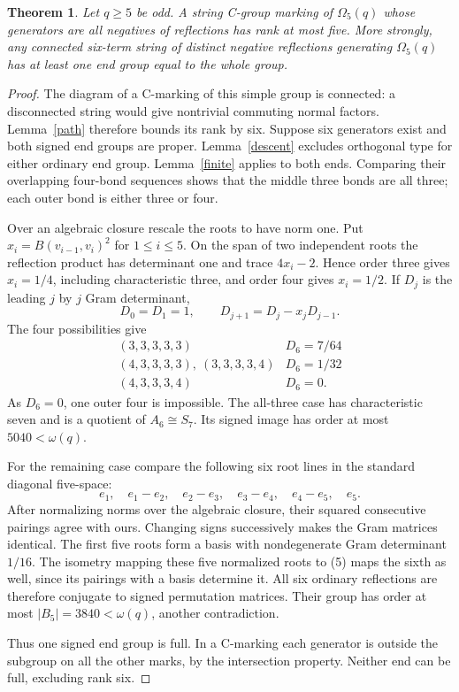 \documentclass[11pt,a4paper]{article}
\newtheorem{theorem}{Theorem}
\newcommand{\Om}{\Omega}
\begin{document}
\begin{theorem}\label{bound}
Let $q\ge5$ be odd. A string C-group marking of $\Om_5(q)$
whose generators are all negatives of reflections has rank at most
five. More strongly, any connected six-term string of distinct negative
reflections generating $\Om_5(q)$ has at least one end group equal
to the whole group.
\end{theorem}
\begin{proof}
The diagram of a C-marking of this simple group is connected:
a disconnected string would give nontrivial commuting normal factors.
Lemma~\ref{path} therefore bounds its rank by six. Suppose six generators
exist and both signed end groups are proper. Lemma~\ref{descent}
excludes orthogonal type for either ordinary end group.
Lemma~\ref{finite} applies to both ends. Comparing their overlapping
four-bond sequences shows that the middle three bonds are all three;
each outer bond is either three or four.

Over an algebraic closure rescale the roots to have norm one.
Put $x_i=B(v_{i-1},v_i)^2$ for $1\le i\le5$.
On the span of two independent roots the reflection product has
determinant one and trace $4x_i-2$. Hence order three gives
$x_i=1/4$, including characteristic three, and order four gives
$x_i=1/2$. If $D_j$ is the leading $j$ by $j$ Gram determinant,
\[
 D_0=D_1=1,\qquad D_{j+1}=D_j-x_jD_{j-1}.          \tag{3}
\]
The four possibilities give
\[
\begin{array}{c|c}
(3,3,3,3,3)&D_6=7/64\\
(4,3,3,3,3),\ (3,3,3,3,4)&D_6=1/32\\
(4,3,3,3,4)&D_6=0.
\end{array}                                                   \tag{4}
\]
As $D_6=0$, one outer four is impossible. The all-three case has
characteristic seven and is a quotient of $A_6\cong S_7$. Its
signed image has order at most $5040<\omega(q)$.

For the remaining case compare the following six root lines in
the standard diagonal five-space:
\[
 e_1,\quad e_1-e_2,\quad e_2-e_3,\quad e_3-e_4,
 \quad e_4-e_5,\quad e_5.                           \tag{5}
\]
After normalizing norms over the algebraic closure, their squared
consecutive pairings agree with ours. Changing signs successively
makes the Gram matrices identical. The first five roots form a
basis with nondegenerate Gram determinant $1/16$. The isometry
mapping these five normalized roots to (5) maps the sixth as well,
since its pairings with a basis determine it. All six ordinary
reflections are therefore conjugate to signed permutation matrices.
Their group has order at most $|B_5|=3840<\omega(q)$, another
contradiction.

Thus one signed end group is full. In a C-marking each generator
is outside the subgroup on all the other marks, by the intersection
property. Neither end can be full, excluding rank six.
\end{proof}
\end{document}
